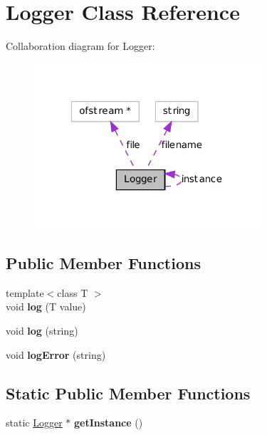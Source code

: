 \hypertarget{class_logger}{
\section{Logger Class Reference}
\label{class_logger}
}


Collaboration diagram for Logger:\nopagebreak
\begin{figure}[H]
\begin{center}
\leavevmode
\includegraphics[width=239pt]{class_logger__coll__graph}
\end{center}
\end{figure}
\subsection*{Public Member Functions}
\begin{DoxyCompactItemize}
\item 
\hypertarget{class_logger_a01acea87f4fb7a014b78cb86d61b3601}{
{\footnotesize template$<$class T $>$ }\\void {\bfseries log} (T value)}
\label{class_logger_a01acea87f4fb7a014b78cb86d61b3601}

\item 
\hypertarget{class_logger_a53416a3009f942c74e37011b88dd58de}{
void {\bfseries log} (string)}
\label{class_logger_a53416a3009f942c74e37011b88dd58de}

\item 
\hypertarget{class_logger_a62b3477c22a38306a6d14ed7c134eade}{
void {\bfseries logError} (string)}
\label{class_logger_a62b3477c22a38306a6d14ed7c134eade}

\end{DoxyCompactItemize}
\subsection*{Static Public Member Functions}
\begin{DoxyCompactItemize}
\item 
\hypertarget{class_logger_afec28ae6d7bdf8f6a0734cb20756de10}{
static \hyperlink{class_logger}{Logger} $\ast$ {\bfseries getInstance} ()}
\label{class_logger_afec28ae6d7bdf8f6a0734cb20756de10}

\end{DoxyCompactItemize}
